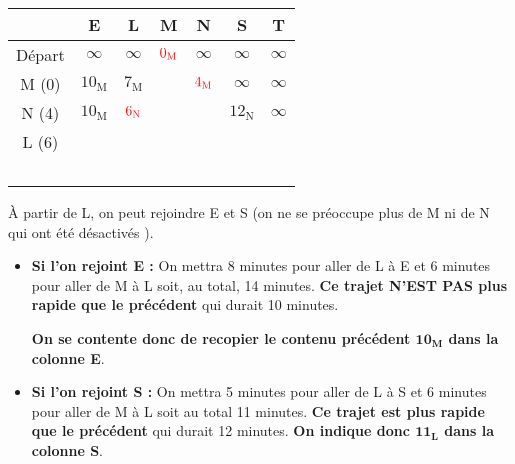 \begin{center}
     \begin{extern}
          \begin{tabularx}{0.9\linewidth}{|c|C|C|C|C|C|C|}
               \hline
               \			&  E 						& L							& M							& N 							& S								& T  						\\ \hline
               Départ			&  $\infty$	 				& $\infty$					& $\color{red}0_{\text{M}}$	& $\infty$					& $\infty$						& $\infty$	  				\\ \hline
               M (0) 			&  $10_{\text{M}}$	 		& $7_{\text{M}}$	 			& 		& $\color{red}4_{\text{M}}$	& $\infty$						& $\infty$ 					\\ \hline
               N (4)			&  $10_{\text{M}}$	 		& $\color{red}6_{\text{N}}$	& \cellcolor{black!20}		& 		& $12_{\text{N}}$				& $\infty$ 					\\ \hline
               L (6)			&  \ 	& 		& \cellcolor{black!20}		& 		& \				& \ 					\\ \hline
               &  \ 	& 		& 		& 		& \				& \ 					\\
          \end{tabularx}
     \end{extern}
\end{center}
\`A partir de L, on peut rejoindre E et S (on ne se préoccupe plus de M ni de N qui ont été \og désactivés \fg{}).
\begin{itemize}
     \item \textbf{Si l'on rejoint E :} On mettra 8 minutes pour aller de L à E et 6 minutes pour aller de M à L soit, au total, 14 minutes. \textbf{Ce trajet N'EST PAS plus rapide que le précédent} qui durait 10 minutes.
     \par
     \textbf{On se contente donc de recopier le contenu précédent $\bm{10_{\text{M}}}$ dans la colonne E}.
     \item \textbf{Si l'on rejoint S :} On mettra 5 minutes pour aller de L à S et 6 minutes pour aller de M à L soit au total 11 minutes. \textbf{Ce trajet est plus rapide que le précédent} qui durait 12 minutes. \textbf{On indique donc $\bm{11_{\text{L}}}$ dans la colonne S}.
\end{itemize}
